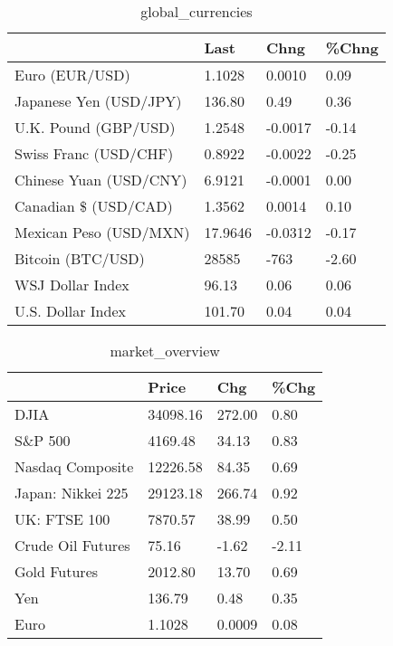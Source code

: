 \documentclass{article}%
\begin{document}
%


\begin{table}[htbp]%
\caption{global\_currencies}%
\centering%
\begin{adjustbox}{width=1\textwidth}%
\begin{tabular}{llll}
\toprule
                       &    Last &    Chng & \%Chng \\
\midrule
        Euro (EUR/USD) &  1.1028 &  0.0010 &  0.09 \\
Japanese Yen (USD/JPY) &  136.80 &    0.49 &  0.36 \\
  U.K. Pound (GBP/USD) &  1.2548 & -0.0017 & -0.14 \\
 Swiss Franc (USD/CHF) &  0.8922 & -0.0022 & -0.25 \\
Chinese Yuan (USD/CNY) &  6.9121 & -0.0001 &  0.00 \\
  Canadian \$ (USD/CAD) &  1.3562 &  0.0014 &  0.10 \\
Mexican Peso (USD/MXN) & 17.9646 & -0.0312 & -0.17 \\
     Bitcoin (BTC/USD) &   28585 &    -763 & -2.60 \\
      WSJ Dollar Index &   96.13 &    0.06 &  0.06 \\
     U.S. Dollar Index &  101.70 &    0.04 &  0.04 \\
\bottomrule
\end{tabular}
%
\end{adjustbox}%
\end{table}

%


\begin{table}[htbp]%
\caption{market\_overview}%
\centering%
\begin{adjustbox}{width=1\textwidth}%
\begin{tabular}{llll}
\toprule
                  &    Price &    Chg &  \%Chg \\
\midrule
             DJIA & 34098.16 & 272.00 &  0.80 \\
          S\&P 500 &  4169.48 &  34.13 &  0.83 \\
 Nasdaq Composite & 12226.58 &  84.35 &  0.69 \\
Japan: Nikkei 225 & 29123.18 & 266.74 &  0.92 \\
     UK: FTSE 100 &  7870.57 &  38.99 &  0.50 \\
Crude Oil Futures &    75.16 &  -1.62 & -2.11 \\
     Gold Futures &  2012.80 &  13.70 &  0.69 \\
              Yen &   136.79 &   0.48 &  0.35 \\
             Euro &   1.1028 & 0.0009 &  0.08 \\
\bottomrule
\end{tabular}
%
\end{adjustbox}%
\end{table}

%
\end{document}
